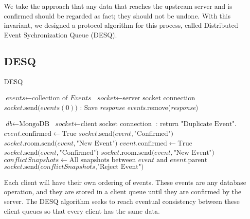 We take the approach that any data that reaches the upstream server and is confirmed should be regarded as fact; they should not be undone. With this invariant, we designed a protocol algorithm for this process, called Distributed Event Sychronization Queue (DESQ).

\subsection{DESQ} 

\begin{center}
\begin{algorithm}
\caption{DESQ}\label{euclid}
\begin{algorithmic}[1]
\State $\textit{events} \gets \text{collection of }\textit{Events}$
\State $\textit{socket} \gets \text{server socket connection}$
\State $socket\text{.send(}events(0)\text{)}$
\EndWhile
{}:
\State Save \emph{response}
\State \emph{events}.remove(\emph{response})
\EndIf
\EndLoop
\EndProcedure
\end{algorithmic}
\begin{algorithmic}[1]
\State $\textit{db} \gets \text{MongoDB}$
\State $\textit{socket} \gets \text{client socket connection}$
:
\State return $\text{"Duplicate Event"}$.
\EndIf
{}
\State $event\text{.confirmed} \gets \text{True}$
\State $socket\text{.send(}event, \text{"Confirmed")}$
\State $socket\text{.room.send(}event, \text{"New Event")}$
\Else
{}
\State $event\text{.confirmed} \gets \text{True}$
\State $socket\text{.send(}event, \text{"Confirmed")}$
\State $socket\text{.room.send(}event, \text{"New Event")}$
\Else
\State $conflictSnapshots \gets \text{All snapshots between }event\text{ and }event\text{.parent}$
\State $socket\text{.send(}conflictSnapshots\text{,"Reject Event")}$
\EndIf
\EndIf
\EndLoop
\EndProcedure
\end{algorithmic}
\end{algorithm}
\end{center}

Each client will have their own ordering of events. These events are any database operation, and they are stored in a client queue until they are confirmed by the server. The DESQ algorithm seeks to reach eventual consistency between these client queues so that every client has the same data.

